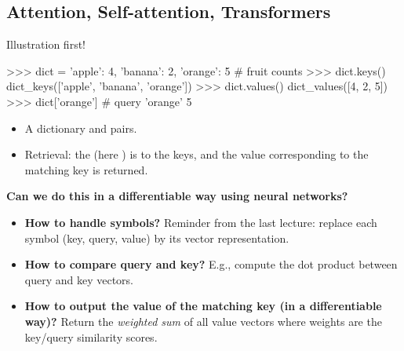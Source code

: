 \subsection{Attention, Self-attention, Transformers}
\begin{frame}[fragile]{Illustration first!}
\vspace{-5mm}
\begin{python}
>>> dict = {'apple': 4, 'banana': 2, 'orange': 5}  # fruit counts
>>> dict.keys()
dict_keys(['apple', 'banana', 'orange'])
>>> dict.values()
dict_values([4, 2, 5])
>>> dict['orange']  # query 'orange'
5
\end{python}
\begin{itemize}
\item A dictionary   and  pairs.
\item Retrieval: the  (here ) is  to the keys,
and the value corresponding to the matching key is returned.
\end{itemize}
\pause
\vsp
\textbf{Can we do this in a differentiable way using neural networks?}
\pause
\begin{itemize}
\item \textbf{How to handle symbols?} Reminder from the last lecture: replace each symbol (key, query, value) by its vector representation.
\pause
\item \textbf{How to compare query and key?} E.g., compute the dot product between query and key vectors.
\pause
\item \textbf{How to output the value of the matching key (in a differentiable way)?} Return the \textit{weighted sum} of all value vectors where weights are the key/query similarity scores.
\end{itemize}
\end{frame}

